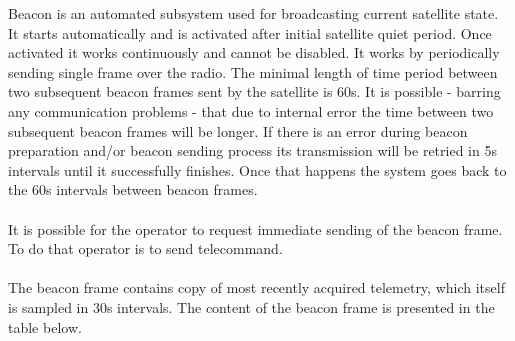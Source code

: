 
Beacon is an automated subsystem used for broadcasting current satellite state. It starts automatically and is activated after 
initial satellite quiet period. Once activated it works continuously and cannot be disabled. It works by periodically sending
single frame over the radio. The minimal length of time period between two subsequent beacon frames sent by the satellite is 
60s. It is possible - barring any communication problems - that due to internal error the time between two subsequent beacon 
frames will be longer. If there is an error during beacon preparation and/or beacon sending process its transmission will
be retried in 5s intervals until it successfully finishes. Once that happens the system goes back to the 60s intervals between
beacon frames. \\\\
It is possible for the operator to request immediate sending of the beacon frame. To do that operator is to send  
telecommand. \\\\
The beacon frame contains copy of most recently acquired telemetry, which itself is sampled in 30s intervals. The content 
of the beacon frame is presented in the table below. 

